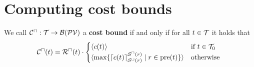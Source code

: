\section{Computing cost bounds}


\begin{definition}
  We call ${\mathcal{C}^\sqcap}: \mathcal{T} \rightarrow \mathcal{B}(\mathcal{PV})$ a \textbf{cost bound} if and only if for all $t \in \mathcal{T}$ it holds that
  \[ {\mathcal{C}^\sqcap}(t) = {\mathcal{R}^\sqcap}(t) \cdot
  \begin{cases}
    \langle c(t)\rangle & \text{if } t \in \mathcal{T}_0 \\
    \langle\max \lbrace \lceil c(t) \rceil^{{\mathcal{S}^\sqcap}(r)}_{{\mathcal{S}^\sqcup}(r)} \mid r \in \text{pre}(t) \rbrace\rangle & \text{otherwise }
  \end{cases}
  \]
\end{definition}
